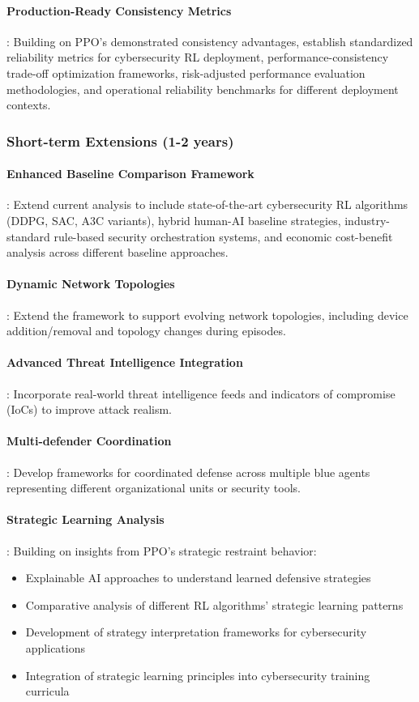 \documentclass[12pt,oneside]{article}
\begin{document}
\paragraph{Production-Ready Consistency Metrics}: Building on PPO's demonstrated consistency advantages, establish standardized reliability metrics for cybersecurity RL deployment, performance-consistency trade-off optimization frameworks, risk-adjusted performance evaluation methodologies, and operational reliability benchmarks for different deployment contexts.

\subsubsection{Short-term Extensions (1-2 years)}

\paragraph{Enhanced Baseline Comparison Framework}: Extend current analysis to include state-of-the-art cybersecurity RL algorithms (DDPG, SAC, A3C variants), hybrid human-AI baseline strategies, industry-standard rule-based security orchestration systems, and economic cost-benefit analysis across different baseline approaches.

\paragraph{Dynamic Network Topologies}: Extend the framework to support evolving network topologies, including device addition/removal and topology changes during episodes.

\paragraph{Advanced Threat Intelligence Integration}: Incorporate real-world threat intelligence feeds and indicators of compromise (IoCs) to improve attack realism.

\paragraph{Multi-defender Coordination}: Develop frameworks for coordinated defense across multiple blue agents representing different organizational units or security tools.

\paragraph{Strategic Learning Analysis}: Building on insights from PPO's strategic restraint behavior:
\begin{itemize}
\item Explainable AI approaches to understand learned defensive strategies
\item Comparative analysis of different RL algorithms' strategic learning patterns
\item Development of strategy interpretation frameworks for cybersecurity applications
\item Integration of strategic learning principles into cybersecurity training curricula
\end{itemize}
\end{document}
